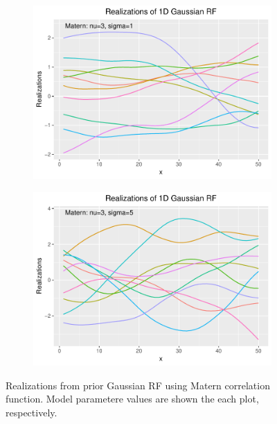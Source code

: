 \begin{figure}
     \begin{subfigure}[H]{0.49\textwidth}
        \centering
        \includegraphics[scale=0.5,trim=0cm 0cm 0cm 0cm]{figures/sample1conf7.pdf}
    \end{subfigure}
    \hfill
    \begin{subfigure}[H]{0.49\textwidth}  
        \centering 
        \includegraphics[scale=0.5,trim=0cm 0cm 0cm 0cm]{figures/sample1conf8.pdf}
    \end{subfigure}

    \caption{Realizations from prior Gaussian RF using Matern correlation function. Model parametere values are shown the each plot, respectively.}
    \label{fig:prior_samp_matern}
\end{figure}

